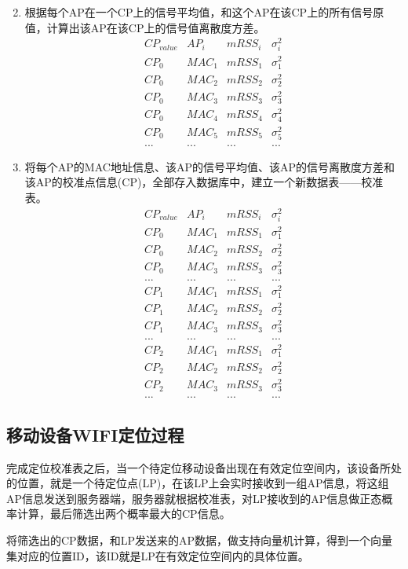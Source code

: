 \documentclass[UTF8, twocolumn ]{ctexart}
\begin{document}
\begin{enumerate}
\begin{displaymath}
\end{displaymath}
\item 根据每个AP在一个CP上的信号平均值，和这个AP在该CP上的所有信号原值，计算出该AP在该CP上的信号值离散度方差。
\begin{displaymath}
\begin{array}{c|c|c|c}
CP_{value} & AP_{i} & mRSS_{i} & \sigma^{2}_{i} \\ \hline
CP_{0} & MAC_{1} & mRSS_{1} & \sigma^{2}_{1} \\
CP_{0} & MAC_{2} & mRSS_{2} & \sigma^{2}_{2} \\
CP_{0} & MAC_{3} & mRSS_{3} & \sigma^{2}_{3} \\
CP_{0} & MAC_{4} & mRSS_{4} & \sigma^{2}_{4} \\
CP_{0} & MAC_{5} & mRSS_{5} & \sigma^{2}_{5} \\
... & ... & ... & ...
\end{array}
\end{displaymath}
\item 将每个AP的MAC地址信息、该AP的信号平均值、该AP的信号离散度方差和该AP的校准点信息(CP)，全部存入数据库中，建立一个新数据表——校准表。
\begin{displaymath}
\begin{array}{c|c|c|c}
CP_{value} & AP_{i} & mRSS_{i} & \sigma^{2}_{i} \\ \hline
CP_{0} & MAC_{1} & mRSS_{1} & \sigma^{2}_{1} \\
CP_{0} & MAC_{2} & mRSS_{2} & \sigma^{2}_{2} \\
CP_{0} & MAC_{3} & mRSS_{3} & \sigma^{2}_{3} \\
... & ... & ... & ... \\
CP_{1} & MAC_{1} & mRSS_{1} & \sigma^{2}_{1} \\
CP_{1} & MAC_{2} & mRSS_{2} & \sigma^{2}_{2} \\
CP_{1} & MAC_{3} & mRSS_{3} & \sigma^{2}_{3} \\
... & ... & ... & ... \\
CP_{2} & MAC_{1} & mRSS_{1} & \sigma^{2}_{1} \\
CP_{2} & MAC_{2} & mRSS_{2} & \sigma^{2}_{2} \\
CP_{2} & MAC_{3} & mRSS_{3} & \sigma^{2}_{3} \\
... & ... & ... & ...
\end{array}
\end{displaymath}
\end{enumerate}

\subsection{移动设备WIFI定位过程}
完成定位校准表之后，当一个待定位移动设备出现在有效定位空间内，该设备所处的位置，就是一个待定位点(LP)，在该LP上会实时接收到一组AP信息，将这组AP信息发送到服务器端，服务器就根据校准表，对LP接收到的AP信息做正态概率计算，最后筛选出两个概率最大的CP信息。
\par
将筛选出的CP数据，和LP发送来的AP数据，做支持向量机计算，得到一个向量集对应的位置ID，该ID就是LP在有效定位空间内的具体位置。
\end{document}
